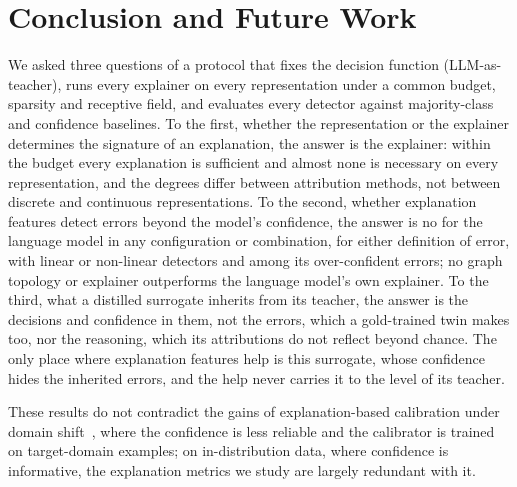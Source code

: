 \section{Conclusion and Future Work}

We asked three questions of a protocol that fixes the decision function (LLM-as-teacher), runs every explainer on every representation under a common budget, sparsity and receptive field, and evaluates every detector against majority-class and confidence baselines. To the first, whether the representation or the explainer determines the signature of an explanation, the answer is the explainer: within the budget every explanation is sufficient and almost none is necessary on every representation, and the degrees differ between attribution methods, not between discrete and continuous representations. To the second, whether explanation features detect errors beyond the model's confidence, the answer is no for the language model in any configuration or combination, for either definition of error, with linear or non-linear detectors and among its over-confident errors; no graph topology or explainer outperforms the language model's own explainer. To the third, what a distilled surrogate inherits from its teacher, the answer is the decisions and confidence in them, not the errors, which a gold-trained twin makes too, nor the reasoning, which its attributions do not reflect beyond chance. The only place where explanation features help is this surrogate, whose confidence hides the inherited errors, and the help never carries it to the level of its teacher.

These results do not contradict the gains of explanation-based calibration under domain shift~\cite{ye2022calibrating}, where the confidence is less reliable and the calibrator is trained on target-domain examples; on in-distribution data, where confidence is informative, the explanation metrics we study are largely redundant with it.

